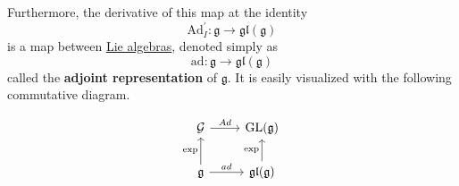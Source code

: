 \documentclass{article}
\DeclareMathOperator{\GL}{GL}
\newcounter{definition}[section]
\begin{document}
    \begin{definition}
      \label{def:adjoint-representation}
      Furthermore, the derivative of this map at the identity 
      \begin{equation}
        \text{Ad}_I^\prime: \mathfrak{g} \rightarrow \mathfrak{gl}(\mathfrak{g})
      \end{equation}
      is a map between \hyperref[def:lie-algebra]{Lie algebras}, denoted simply as 
      \begin{equation}
        \text{ad}: \mathfrak{g} \rightarrow \mathfrak{gl}(\mathfrak{g})
      \end{equation}
      called the \textbf{adjoint representation} of $\mathfrak{g}$. It is easily visualized with the following commutative diagram. 

      \begin{equation}
        \begin{tikzcd}
            \mathcal{G} \arrow{r}{Ad} & \GL(\mathfrak{g}) \\
            \mathfrak{g} \arrow{u}{\exp} \arrow{r}{ad} & \mathfrak{gl}(\mathfrak{g}) \arrow{u}{\exp}
            \end{tikzcd}
      \end{equation}


\end{definition}
\end{document}
